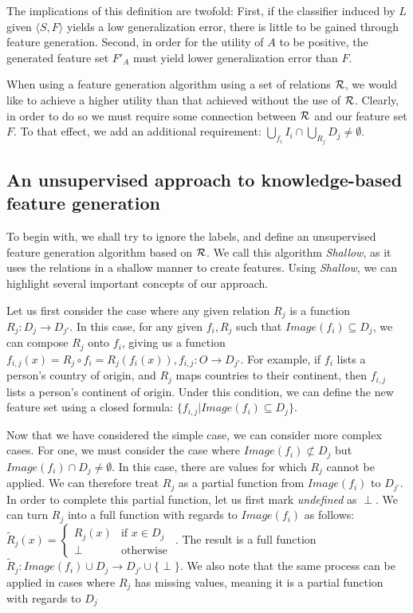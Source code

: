 \documentclass[twoside,11pt]{article}
\theoremstyle{definition}
\begin{document}
The implications of this definition are twofold: First, if the classifier induced by $L$ given  $\langle S,F \rangle$ yields a low generalization error, there is little to be gained through feature generation. Second, in order for the utility of $A$ to be positive, the generated feature set $F'_A$ must yield lower generalization error than $F$.

When using a feature generation algorithm using a set of relations ${\cal R}$, we would like to achieve a higher utility than that achieved without the use of ${\cal R}$. Clearly, in order to do so we must require some connection between ${\cal R}$ and our feature set $F$. To that effect, we add an additional requirement:  $\bigcup_{f_i} I_i \cap \bigcup_{R_j} D_j \neq \emptyset$. 

\subsection{An unsupervised approach to knowledge-based feature generation} \label{shallow_section}

To begin with, we shall try to ignore the labels, and define an unsupervised feature generation algorithm based on ${\cal R}$. We call this algorithm \emph{Shallow}, as it uses the relations in a shallow manner to create features. Using \emph{Shallow}, we can highlight several important concepts of our approach.

Let us first consider the case where any given relation $R_j$ is a function $R_j:D_j\rightarrow D_{j'}$. In this case, for any given $f_i,R_j$ such that 
$Image(f_i) \subseteq D_j$, we can compose $R_j$ onto $f_i$, giving us a function $f_{i,j}(x)=R_j\circ f_i=R_j(f_i(x)),f_{i,j}:O\rightarrow D_{j'}$. For example, if $f_i$ lists a person's country of origin, and $R_j$ maps countries to their continent, then $f_{i,j}$ lists a person's continent of origin.
Under this condition, we can define the new feature set using a closed formula: $\{f_{i,j}|Image(f_i) \subseteq D_j\}$.

Now that we have considered the simple case, we can consider more complex cases.
For one, we must consider the case where $Image(f_i) \not\subset D_j$ but $Image(f_i) \cap D_j \neq\emptyset$. In this case, there are values for which $R_j$ cannot be applied. We can therefore treat $R_j$ as a partial function from $Image(f_i)$ to $D_{j'}$. In order to complete this partial function, let us first mark \emph{undefined} as $\perp$. We can turn $R_j$ into a full function with regards to $Image(f_i)$ as follows: $\tilde{R}_j(x)=\begin{cases} R_j(x) &\mbox{if } x\in D_j\\ 
\perp & \mbox{otherwise } \end{cases}$.
The result is a full function $\tilde{R}_j:Image(f_i)\cup D_j\rightarrow D_{j'}\cup\{\perp\}$. We also note that the same process can be applied in cases where $R_j$  has missing values, meaning it is a partial function with regards to $D_j$
\end{document}
